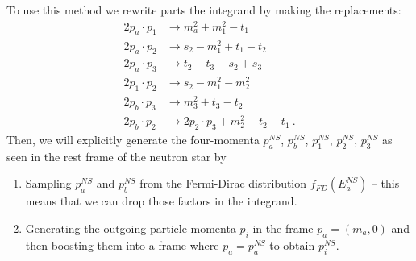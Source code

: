 To use this method we rewrite parts the integrand by making the replacements:
\begin{align}
    2 p_a \cdot p_1 &\rightarrow m_a^2 +  m_1^2 - t_1 \label{eq:pa-dot-p1-replacement-rule} \\
    2 p_a \cdot p_2 &\rightarrow s_2 - m_1^2 + t_1 - t_2 \\
    2 p_a \cdot p_3 &\rightarrow t_2 - t_3 - s_2 + s_3 \\
    2 p_1 \cdot p_2 &\rightarrow s_2 - m_1^2 - m_2^2 \\
    2p_b \cdot p_3 &\rightarrow m_3^2 + t_3 - t_2 \\
    2p_b \cdot p_2 &\rightarrow 2 p_2 \cdot p_3 + m_2^2 + t_2 - t_1  \ . \label{eq:pb-dot-p2-replacement-rule} 
\end{align}
Then, we will explicitly generate the four-momenta $p_a^{NS}$, $p_b^{NS}$, $p_1^{NS}$, $p_2^{NS}$, $p_3^{NS}$ as seen in the rest frame of the neutron star by 
\begin{enumerate}
    \item Sampling $p_a^{NS}$ and $p_b^{NS}$ from the Fermi-Dirac distribution $f_{FD}(E_a^{NS})$ -- this means that we can drop those factors in the integrand.
    \item Generating the outgoing particle momenta $p_i$ in the frame $p_a = (m_a, 0)$ and then boosting them into a frame where $p_a = p_a^{NS}$ to obtain $p_i^{NS}$.
\end{enumerate}

